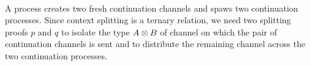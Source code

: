 \begin{AgdaAlign}
\begin{code}%
%
\>[3]%
\>[13]\AgdaSymbol{:}%
\>[1582I]\AgdaSpace{}%
\AgdaSpace{}%
\AgdaSpace{}%
\AgdaSpace{}%
\AgdaSpace{}%
\AgdaSymbol{\}}\AgdaSpace{}%
\AgdaSymbol{(}\AgdaSpace{}%
\AgdaSymbol{:}\AgdaSpace{}%
\AgdaSpace{}%
\AgdaSpace{}%
\AgdaSpace{}%
\AgdaSpace{}%
\AgdaSpace{}%
\AgdaOperator{\AgdaFunction{,}}\AgdaSpace{}%
\AgdaSymbol{)}\AgdaSpace{}%
\AgdaSymbol{(}\AgdaSpace{}%
\AgdaSymbol{:}\AgdaSpace{}%
\AgdaSpace{}%
\AgdaSpace{}%
\AgdaSpace{}%
\AgdaOperator{\AgdaDatatype{+}}\AgdaSpace{}%
\AgdaSymbol{)}\AgdaSpace{}%
\<%
\\
\>[.][@{}l@{}]\<[1582I]%
\>[15]\AgdaSpace{}%
\AgdaSymbol{(}\AgdaSpace{}%
\AgdaSpace{}%
\AgdaSymbol{)}\AgdaSpace{}%
\AgdaSpace{}%
\AgdaSpace{}%
\AgdaSymbol{(}\AgdaSpace{}%
\AgdaSpace{}%
\AgdaSymbol{)}\AgdaSpace{}%
\AgdaSpace{}%
\AgdaSpace{}%
\<%
\end{code}

A  process creates two fresh continuation
channels and spaws two continuation processes. Since context splitting is a
ternary relation, we need two splitting proofs $p$ and $q$ to isolate the type
$A \mathbin\otimes B$ of channel on which the pair of continuation channels is sent and to
distribute the remaining channel across the two continuation processes.

\begin{code}%
%
\>[3]%
\>[13]\AgdaSymbol{:}%
\>[1616I]\AgdaSpace{}%
\AgdaSpace{}%
\AgdaSpace{}%
\AgdaSymbol{\}}\AgdaSpace{}%
\AgdaSymbol{(}\AgdaSpace{}%
\AgdaSymbol{:}\AgdaSpace{}%
\AgdaSpace{}%
\AgdaSpace{}%
\AgdaSpace{}%
\AgdaSpace{}%
\AgdaSpace{}%
\AgdaOperator{\AgdaFunction{,}}\AgdaSpace{}%
\AgdaSymbol{)}\AgdaSpace{}%
\<%
\\
\>[.][@{}l@{}]\<[1616I]%
\>[15]\AgdaSpace{}%
\AgdaSymbol{(}\AgdaSpace{}%
\AgdaSpace{}%
\AgdaSpace{}%
\AgdaSpace{}%
\AgdaSymbol{)}\AgdaSpace{}%
\AgdaSpace{}%
\AgdaSpace{}%
\<%
\end{code}


\end{AgdaAlign}
